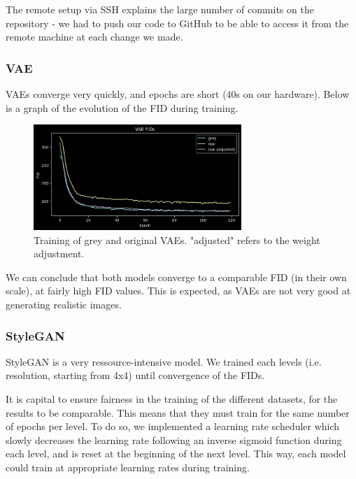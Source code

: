 \documentclass{article}
\begin{document}

The remote setup via SSH explains the large number of commits on the repository - we had to push our code to GitHub to be able to access it from the remote machine at each change we made.

\subsubsection*{VAE}

VAEs converge very quickly, and epochs are short (40s on our hardware). Below is a graph of the evolution of the FID during training.

\begin{figure}[H]
    \centering
    \includegraphics[width=0.7\textwidth]{images/vae_fids.png}
    \caption{Training of grey and original VAEs. "adjusted" refers to the weight adjustment.}
\end{figure}

We can conclude that both models converge to a comparable FID (in their own scale), at fairly high FID values. This is expected, as VAEs are not very good at generating realistic images. 

\subsubsection*{StyleGAN}
StyleGAN is a very ressource-intensive model. 
We trained each levels (i.e. resolution, starting from 4x4) until convergence of the FIDs. 

It is capital to ensure fairness in the training of the different datasets, for the results to be comparable. This means that they must train for the same number of epochs per level. To do so, we implemented a learning rate scheduler which slowly decreases the learning rate following an inverse sigmoid function during each level, and is reset at the beginning of the next level. This way, each model could train at appropriate learning rates during training.
\end{document}
